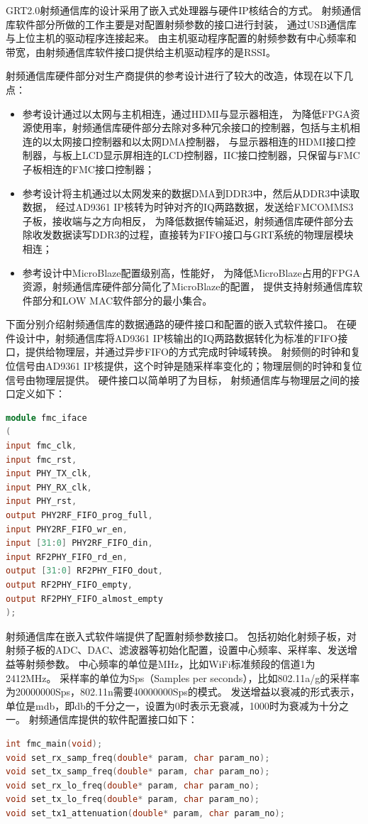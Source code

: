 	GRT2.0射频通信库的设计采用了嵌入式处理器与硬件IP核结合的方式。
	射频通信库软件部分所做的工作主要是对配置射频参数的接口进行封装，
	通过USB通信库与上位主机的驱动程序连接起来。
	由主机驱动程序配置的射频参数有中心频率和带宽，由射频通信库软件接口提供给主机驱动程序的是RSSI。

	射频通信库硬件部分对生产商提供的参考设计进行了较大的改造，体现在以下几点：
		\begin{itemize}
			\item 参考设计通过以太网与主机相连，通过HDMI与显示器相连，
			为降低FPGA资源使用率，射频通信库硬件部分去除对多种冗余接口的控制器，包括与主机相连的以太网接口控制器和以太网DMA控制器，
			与显示器相连的HDMI接口控制器，与板上LCD显示屏相连的LCD控制器，IIC接口控制器，只保留与FMC子板相连的FMC接口控制器；
			\item 参考设计将主机通过以太网发来的数据DMA到DDR3中，然后从DDR3中读取数据，
			经过AD9361 IP核转为时钟对齐的IQ两路数据，发送给FMCOMMS3子板，接收端与之方向相反，
			为降低数据传输延迟，射频通信库硬件部分去除收发数据读写DDR3的过程，直接转为FIFO接口与GRT系统的物理层模块相连；
			\item 参考设计中MicroBlaze配置级别高，性能好，
			为降低MicroBlaze占用的FPGA资源，射频通信库硬件部分简化了MicroBlaze的配置，
			提供支持射频通信库软件部分和LOW MAC软件部分的最小集合。
		\end{itemize}

	下面分别介绍射频通信库的数据通路的硬件接口和配置的嵌入式软件接口。
	在硬件设计中，射频通信库将AD9361 IP核输出的IQ两路数据转化为标准的FIFO接口，提供给物理层，并通过异步FIFO的方式完成时钟域转换。
	射频侧的时钟和复位信号由AD9361 IP核提供，这个时钟是随采样率变化的；物理层侧的时钟和复位信号由物理层提供。
	硬件接口以简单明了为目标，
	射频通信库与物理层之间的接口定义如下：
	\begin{lstlisting}[language={Verilog}]
module fmc_iface
(
input fmc_clk,
input fmc_rst,
input PHY_TX_clk,
input PHY_RX_clk,
input PHY_rst,
output PHY2RF_FIFO_prog_full,
input PHY2RF_FIFO_wr_en,
input [31:0] PHY2RF_FIFO_din,
input RF2PHY_FIFO_rd_en,
output [31:0] RF2PHY_FIFO_dout,
output RF2PHY_FIFO_empty,
output RF2PHY_FIFO_almost_empty
);
	\end{lstlisting}

	射频通信库在嵌入式软件端提供了配置射频参数接口。
	包括初始化射频子板，对射频子板的ADC、DAC、滤波器等初始化配置，设置中心频率、采样率、发送增益等射频参数。
	中心频率的单位是MHz，比如WiFi标准频段的信道1为2412MHz。
	采样率的单位为Sps（Samples per seconds），比如802.11a/g的采样率为20000000Sps，802.11n需要40000000Sps的模式。
	发送增益以衰减的形式表示，单位是mdb，即db的千分之一，设置为0时表示无衰减，1000时为衰减为十分之一。
	射频通信库提供的软件配置接口如下：
	\begin{lstlisting}[language={C}]
int fmc_main(void);
void set_rx_samp_freq(double* param, char param_no);
void set_tx_samp_freq(double* param, char param_no);
void set_rx_lo_freq(double* param, char param_no);
void set_tx_lo_freq(double* param, char param_no);
void set_tx1_attenuation(double* param, char param_no);
	\end{lstlisting}

